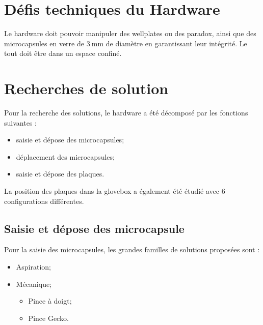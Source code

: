 \section{Défis techniques du Hardware}
Le hardware doit pouvoir manipuler des \glspl{wellplate} ou des \gls{paradox}, ainsi que des \glspl{microcapsule} en verre de $\qty{3}{\mm}$ de diamètre en garantissant leur intégrité. Le tout doit être dans un espace confiné.
\section{Recherches de solution}
Pour la recherche des solutions, le hardware a été décomposé par les fonctions suivantes : 
\begin{itemize}
    \item saisie et dépose des \glspl{microcapsule};
    \item déplacement des \glspl{microcapsule};
    \item saisie et dépose des plaques.
\end{itemize} 
La position des plaques dans la \gls{glovebox} a également été étudié avec $6$ configurations différentes.
\subsection{Saisie et dépose des microcapsule}
Pour la saisie des \glspl{microcapsule}, les grandes familles de solutions proposées sont : 
\begin{itemize}
    \item Aspiration;
    \item Mécanique; \begin{itemize}
        \item Pince à doigt;
        \item Pince Gecko.
    \end{itemize}
\end{itemize}
